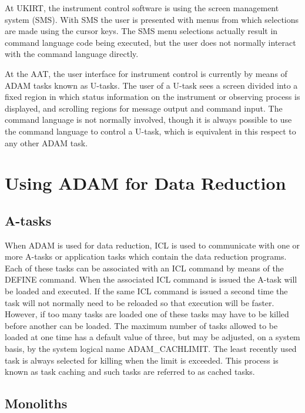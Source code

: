 At UKIRT, the instrument control software is using the screen management
system (SMS). With SMS the user is presented with menus from which
selections are made using the cursor keys. The SMS menu selections actually
result in command language code being executed, but the user does not
normally interact with the command language directly.

At the AAT, the user interface for instrument control is currently by
means of ADAM tasks known as U-tasks. The user of a U-task sees a screen
divided into a fixed region in which status information on the instrument
or observing process is displayed, and scrolling regions for message
output and command input. The command language is not normally involved,
though it is always possible to use the command language to control
a U-task, which is equivalent in this respect to any other ADAM task.       

\chapter{Using ADAM for Data Reduction}
                                                                  
\section{A-tasks}

When ADAM is used for data reduction, ICL is used to communicate with one
or more A-tasks or application tasks which contain the data reduction programs.
Each of these tasks can be associated with an ICL command by means of the
DEFINE command. When the associated ICL command is issued the A-task will
be loaded and executed. If the same ICL command is issued a second time
the task will not normally need to be reloaded so that execution will be
faster. However, if too many tasks are loaded one of these tasks may have
to be killed before another can be loaded. The maximum number of tasks
allowed to be loaded at one time has a default value of three, but may
be adjusted, on a system basis, by the system logical name ADAM\_CACHLIMIT. 
The least recently used task is always selected
for killing when the limit is exceeded. This process is known as task caching
and such tasks are referred to as cached tasks.
                 
\section{Monoliths}

